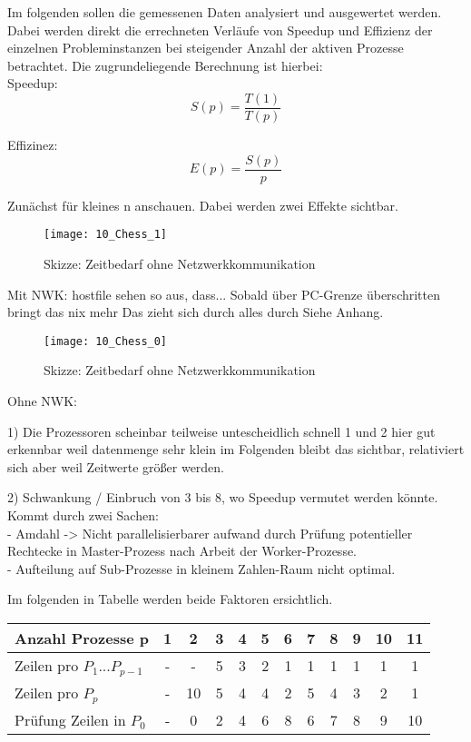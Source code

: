 \documentclass[
10pt, %
a4paper, %
oneside, %
headinclude,footinclude, %
BCOR5mm, %
]{scrartcl}
\begin{document}
Im folgenden sollen die gemessenen Daten analysiert und ausgewertet werden. Dabei werden direkt die errechneten Verläufe von Speedup und Effizienz der einzelnen Probleminstanzen bei steigender Anzahl der aktiven Prozesse betrachtet. Die zugrundeliegende Berechnung ist hierbei:\\

Speedup:
\begin{equation}
S(p)=\frac{T(1)}{T(p)}
\end{equation}

Effizinez:
\begin{equation}
E(p)=\frac{S(p)}{p}
\end{equation}

Zunächst für kleines n anschauen. 
Dabei werden zwei Effekte sichtbar.

\begin{figure}[h]
	\centering 
	\texttt{[image: 10\_Chess\_1]} 
	\caption[Skizze: Zeitbedarf ohne Netzwerkkommunikation]{Skizze: Zeitbedarf ohne Netzwerkkommunikation}
\end{figure}

Mit NWK:
hostfile sehen so aus, dass...
Sobald über PC-Grenze überschritten bringt das nix mehr
Das zieht sich durch alles durch Siehe Anhang.


\begin{figure}[h]
	\centering 
	\texttt{[image: 10\_Chess\_0]} 
	\caption[Skizze: Zeitbedarf ohne Netzwerkkommunikation]{Skizze: Zeitbedarf ohne Netzwerkkommunikation}
\end{figure}

Ohne NWK:

1) Die Prozessoren scheinbar teilweise untescheidlich schnell
1 und 2 
hier gut erkennbar weil datenmenge sehr klein
im Folgenden bleibt das sichtbar, relativiert sich aber weil Zeitwerte größer werden.

2) Schwankung / Einbruch von 3 bis 8, wo Speedup vermutet werden könnte.\\ 
Kommt durch zwei Sachen:\\
 - Amdahl -> Nicht parallelisierbarer aufwand durch Prüfung potentieller Rechtecke in Master-Prozess nach Arbeit der Worker-Prozesse.\\
 - Aufteilung auf Sub-Prozesse in kleinem Zahlen-Raum nicht optimal.

Im folgenden in Tabelle werden beide Faktoren ersichtlich.\\

\begin{tabular}{l|c|c|c|c|c|c|c|c|c|c|c|}
\hline 
Anzahl Prozesse p & 1 & 2 & 3 & 4 & 5 & 6 & 7 & 8  & 9 &  10 & 11\\ 
\hline 
Zeilen pro \(P_1 ... P_{p-1}\) & - & - & 5 & 3 & 2 & 1 & 1 & 1  & 1 &  1 & 1\\
\hline 
Zeilen pro \(P_{p}\) & - & 10 & 5 & 4 & 4 & 2 & 5 & 4  & 3 &  2 & 1\\
\hline 
Prüfung Zeilen in \(P_{0}\) & - & 0 & 2 & 4 & 6 & 8 & 6 & 7  & 8 &  9 & 10\\
\hline 
\end{tabular}\\
\end{document}
